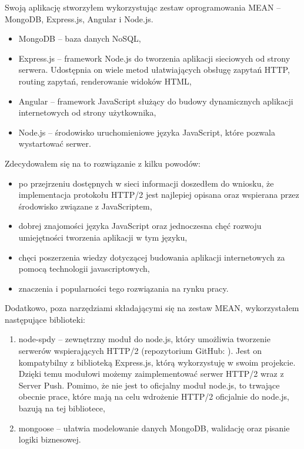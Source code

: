 \documentclass[a4paper,12pt,twoside,openany]{report}
\begin{document}
Swoją aplikację stworzyłem wykorzystując zestaw oprogramowania MEAN\cite{mean} -- MongoDB, Express.js, Angular i Node.js.

\begin{itemize}
	\item MongoDB -- baza danych NoSQL,
	\item Express.js -- framework Node.js do tworzenia aplikacji sieciowych od strony serwera.
	Udostępnia on wiele metod ułatwiających obsługę zapytań HTTP, routing zapytań, renderowanie widoków HTML,
	\item Angular -- framework JavaScript służący do budowy dynamicznych aplikacji internetowych od strony użytkownika,
	\item Node.js -- środowisko uruchomieniowe języka JavaScript, które pozwala wystartować serwer.
\end{itemize}

Zdecydowałem się na to rozwiązanie z kilku powodów:

\begin{itemize}
	\item po przejrzeniu dostępnych w sieci informacji doszedłem do wniosku, że implementacja protokołu HTTP/2 jest najlepiej opisana oraz wspierana przez środowisko związane z JavaScriptem,
	\item dobrej znajomości języka JavaScript oraz jednoczesna chęć rozwoju umiejętności tworzenia aplikacji w tym języku,
	\item chęci poszerzenia wiedzy dotyczącej budowania aplikacji internetowych za pomocą technologii javascriptowych,
	\item znaczenia i popularności tego rozwiązania na rynku pracy.
\end{itemize}

Dodatkowo, poza narzędziami składającymi się na zestaw MEAN, wykorzystałem następujące biblioteki:
\begin{enumerate}
	\item node-spdy -- zewnętrzny moduł do node.js, który umożliwia tworzenie serwerów wspierających HTTP/2 (repozytorium GitHub: \cite{spdy}).
	Jest on kompatybilny z biblioteką Express.js, którą wykorzystuję w swoim projekcie.
	Dzięki temu modułowi możemy zaimplementować serwer HTTP/2 wraz z Server Push.
	Pomimo, że nie jest to oficjalny moduł node.js, to trwające obecnie prace, które mają na celu wdrożenie HTTP/2 oficjalnie do node.js, bazują na tej bibliotece,
	\item mongoose -- ułatwia modelowanie danych MongoDB, walidację oraz pisanie logiki biznesowej. 
\end{enumerate}
\end{document}
